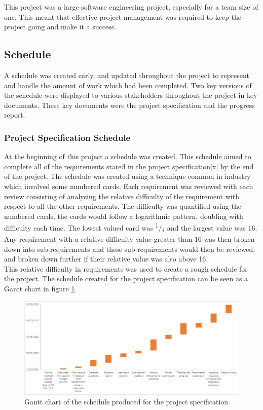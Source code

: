 \documentclass{article}
\begin{document}
This project was a large software engineering project, especially for a team size of one. This meant that effective project management was required to keep the project going and make it a success. 

\subsection{Schedule}

A schedule was created early, and updated throughout the project to represent and handle the amount of work which had been completed. Two key versions of the schedule were displayed to various stakeholders throughout the project in key documents. These key documents were the project specification and the progress report. 

\subsubsection{Project Specification Schedule}

At the beginning of this project a schedule was created. This schedule aimed to complete all of the requirements stated in the project specification[x] by the end of the project. The schedule was created using a technique common in industry which involved some numbered cards. Each requirement was reviewed with each review consisting of analysing the relative difficulty of the requirement with respect to all the other requirements. The difficulty was quantified using the numbered cards, the cards would follow a logarithmic pattern, doubling with difficulty each time. The lowest valued card was \textsuperscript{1}/\textsubscript{4} and the largest value was 16. Any requirement with a relative difficulty value greater than 16 was then broken down into sub-requirements and these sub-requirements would then be reviewed, and broken down further if their relative value was also above 16. \\

This relative difficulty in requirements was used to create a rough schedule for the project. The schedule created for the project specification can be seen as a Gantt chart in figure \ref{figure:projectSpecGanttChart}. \\

\begin{figure}[H]
	\centering
	\includegraphics[width=\linewidth]{./data/projectSpecGanttChart.png}
	\caption{Gantt chart of the schedule produced for the project specification.}
	\label{figure:projectSpecGanttChart}
\end{figure}
\end{document}
